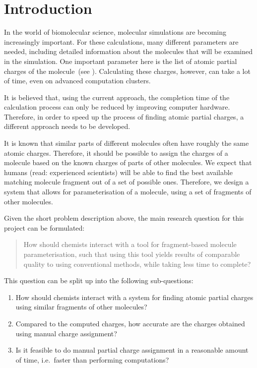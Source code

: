 \chapter{Introduction}

In the world of biomolecular science, molecular simulations are becoming increasingly important. For these calculations, many different parameters are needed, including detailed information about the molecules that will be examined in the simulation. One important parameter here is the list of atomic partial charges of the molecule~(see ). Calculating these charges, however, can take a lot of time, even on advanced computation clusters.

It is believed that, using the current approach, the completion time of the calculation process can only be reduced by improving computer hardware. Therefore, in order to speed up the process of finding atomic partial charges, a different approach needs to be developed.

It is known that similar parts of different molecules often have roughly the same atomic charges. Therefore, it should be possible to assign the charges of a molecule based on the known charges of parts of other molecules. We expect that humans (read: experienced scientists) will be able to find the best available matching molecule fragment out of a set of possible ones. Therefore, we design a system that allows for parameterisation of a molecule, using a set of fragments of other molecules.

Given the short problem description above, the main research question for this project can be formulated:
\begin{quote}
How should chemists interact with a tool for fragment-based molecule parameterisation, such that using this tool yields results of comparable quality to using conventional methods, while taking less time to complete?
\end{quote}

This question can be split up into the following sub-questions:
\begin{enumerate}
\item How should chemists interact with a system for finding atomic partial charges using similar fragments of other molecules?
\item Compared to the computed charges, how accurate are the charges obtained using manual charge assignment?
\item Is it feasible to do manual partial charge assignment in a reasonable amount of time, i.e.\ faster than performing computations?
\end{enumerate}

